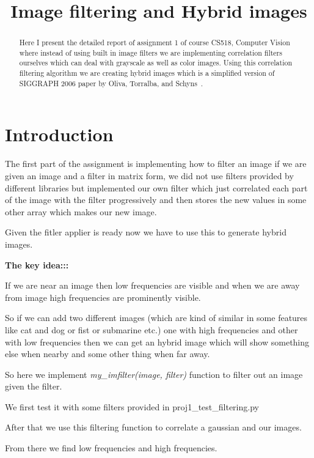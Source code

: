 \documentclass{bmvc2k}
\title{Image filtering and Hybrid images}
\begin{document}
\maketitle

\begin{abstract}
Here I present the detailed report of assignment 1 of course CS518, Computer Vision where instead of using built in image filters
we are implementing correlation filters ourselves which can deal with grayscale as well as color images. 
Using this correlation filtering algorithm we are creating hybrid images which is a simplified version of SIGGRAPH 2006 paper by 
Oliva, Torralba, and Schyns~\cite{hybrid}.
\end{abstract}

\section{Introduction}
\label{sec:intro}

The first part of the assignment is implementing how to filter an image if we are given an image and a filter in matrix form, we did not use filters provided by different libraries but implemented our own filter
which just correlated each part of the image with the filter progressively and then stores the new values in some other array which makes our new image. 

Given the fitler applier is ready now we have to use this to generate hybrid images. 


\textbf{The key idea:::}

If we are near an image then low frequencies are visible and when we are away from image high
frequencies are prominently visible. 

So if we can add two different images (which are kind of similar in some features like cat and dog or fist or submarine etc.) one with high frequencies and other with low frequencies then we can get an hybrid image 
which will show something else when nearby and some other thing when far away. 

So here we implement  \emph{my\_imfilter(image, filter)} function to filter out an image given the filter. 

We first test it with some filters provided in proj1\_test\_filtering.py

After that we use this filtering function to correlate a gaussian and our images. 

From there we find low frequencies and high frequencies. 
\end{document}
